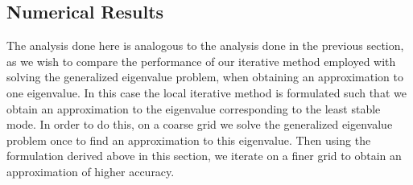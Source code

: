 \documentclass[a4paper, 12pt, twoside, openright]{article}
\numberwithin{equation}{section}
\begin{document}
\subsection{Numerical Results}

The analysis done here is analogous to the analysis done in the previous section, as we wish to compare the performance of our iterative method employed with solving the generalized eigenvalue problem, when obtaining an approximation to one eigenvalue. In this case the local iterative method is formulated such that we obtain an approximation to the eigenvalue corresponding to the least stable mode. In order to do this, on a coarse grid we solve the generalized eigenvalue problem once to find an approximation to this eigenvalue. Then using the formulation derived above in this section, we iterate on a finer grid to obtain an approximation of higher accuracy. %
\end{document}
